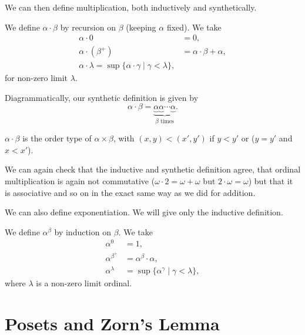 \documentclass[a3paper, 10pt]{article}
\begin{document}
\begin{multicols*}{5}
We can then define multiplication, both inductively and synthetically.

\begin{definition}
  We define $\alpha \cdot \beta$ by recursion on $\beta$ (keeping $\alpha$ fixed). We take
  \begin{align*}
    \alpha \cdot 0 &= 0, \\
    \alpha \cdot (\beta^+) &= \alpha \cdot \beta + \alpha, \\
    \alpha \cdot \lambda = \sup \{\alpha \cdot \gamma \mid \gamma < \lambda\},
  \end{align*} 
  for non-zero limit $\lambda$.
\end{definition}

Diagrammatically, our synthetic definition is given by
$$
\alpha \cdot \beta = \underbrace{
  \underbrace{\alpha}
  \underbrace{\alpha}
  \cdots
  \underbrace{\alpha}
}_{\beta\text{ times}}.
$$

\begin{definition}
  $\alpha \cdot \beta$ is the order type of $\alpha \times \beta$, with $(x, y) < (x', y')$ if $y < y'$ or ($y = y'$ and $x < x'$).
\end{definition}

We can again check that the inductive and synthetic definition agree, that ordinal multiplication is again not commutative ($\omega \cdot 2 = \omega + \omega$ but $2 \cdot \omega = \omega$) but that it is associative and so on in the exact same way as we did for addition.

We can also define exponentiation. We will give only the inductive definition.

\begin{definition}
  We define $\alpha^\beta$ by induction on $\beta$. We take
  \begin{align*}
    \alpha^0 &= 1, \\
    \alpha^{\beta^+} &= \alpha^\beta \cdot \alpha, \\
    \alpha^\lambda &= \sup \{\alpha^\gamma \mid \gamma < \lambda\},
  \end{align*}
  where $\lambda$ is a non-zero limit ordinal.
\end{definition}


\section{Posets and Zorn's Lemma}


\end{multicols*}
\end{document}
